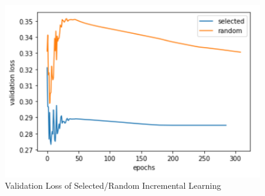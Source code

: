 \begin{figure}[H]
    \hfil
    \begin{minipage}[t]{0.9\textwidth}
        \includegraphics[width=\textwidth]{fig/loss.png}
        \caption{\label{fig:parallel1} Validation Loss of Selected/Random Incremental Learning}
    \end{minipage}
    \hfil
\end{figure}